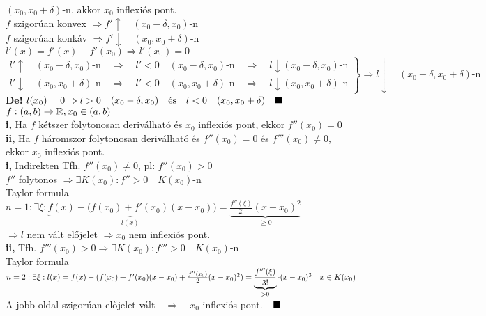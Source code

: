 \documentclass[a4paper,11pt]{article}
\begin{document}
$(x_0,x_0+\delta)$-n, akkor $x_0$ inflexiós pont.\\[0.2cm]
\biz $f$ szigorúan konvex $\Rightarrow f'\uparrow\quad(x_0-\delta,x_0)$-n\\[0.2cm]
\hspace*{2.4cm} $f$ szigorúan konkáv $\Rightarrow f'\downarrow\quad
(x_0,x_0+\delta)$-n\\[0.2cm]$l'(x)=f'(x)-f'(x_0)\Rightarrow l'(x_0)=0$\\[0.2cm]
$\left.
\begin{gathered}
l'\uparrow\quad(x_0-\delta,x_0)\text{-n}\quad\Rightarrow\quad l'<0\quad
(x_0-\delta,x_0)\text{-n}\quad\Rightarrow\quad l\downarrow(x_0-\delta,x_0)\text{-n} \\
l'\downarrow\quad(x_0,x_0+\delta)\text{-n}\quad\Rightarrow\quad l'<0\quad
(x_0,x_0+\delta)\text{-n}\quad\Rightarrow\quad l\downarrow(x_0,x_0+\delta)\text{-n}
\end{gathered}
\right\}\Rightarrow l\downarrow\quad(x_0-\delta,x_0+\delta)\text{-n}$\\[0.2cm]
\textbf{De!} $l(x_0)=0\Rightarrow l>0\quad(x_0-\delta,x_0)\quad\text{és}\quad
l<0\quad(x_0,x_0+\delta)\quad\blacksquare$\\[0.3cm]
\tetel $f:(a,b)\to\mathbb{R},x_0\in(a,b)$\\[0.1cm]\textbf{i,} Ha $f$ kétszer folytonosan
deriválható és $x_0$ inflexiós pont, ekkor $f''(x_0)=0$\\[0.1cm]\textbf{ii,}
Ha $f$ háromszor folytonosan deriválható és $f''(x_0)=0$ és $f'''(x_0)\neq0$, ekkor
$x_0$ inflexiós pont.\\[0.2cm]\biz
\textbf{i,} Indirekten Tfh. $f''(x_0)\neq0$, pl: $f''(x_0)>0$\\[0.1cm]
$f''$ folytonos $\Rightarrow\exists K(x_0):f''>0\quad K(x_0)$-n\\[0.1cm]
Taylor formula\\[0.1cm] $n=1:\exists\xi:\underbrace{f(x)-(f(x_0)+f'(x_0)
(x-x_0)}_{l(x)})=\underbrace{\frac{f''(\xi)}{2!}(x-x_0)^2}_{\geq0}$\\[0.1cm]
$\Rightarrow l$ nem vált előjelet $\Rightarrow x_0$ nem inflexiós pont.\\[0.2cm]
\textbf{ii,} Tfh. $f'''(x_0)>0\Rightarrow\exists K(x_0):f'''>0\quad K(x_0)$-n
\\[0.1cm]Taylor formula $n=2:\\[0.1cm]\exists\xi:l(x)=f(x)-(f(x_0)+f'(x_0)(x-x_0)+
\frac{f''(x_0)}{2}(x-x_0)^2)=\underbrace{\frac{f'''(\xi)}{3!}}_{>0}
\cdot(x-x_0)^3\quad x\in K(x_0)$\\[0.2cm]A jobb oldal szigorúan előjelet
vált$\quad\Rightarrow\quad x_0$ inflexiós pont.$\quad\blacksquare$
\end{document}

